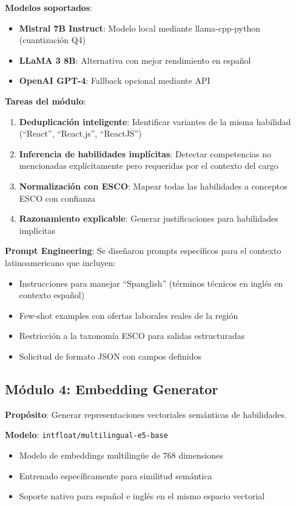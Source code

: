 \textbf{Modelos soportados}:
\begin{itemize}
    \item \textbf{Mistral 7B Instruct}: Modelo local mediante llama-cpp-python (cuantización Q4)
    \item \textbf{LLaMA 3 8B}: Alternativa con mejor rendimiento en español
    \item \textbf{OpenAI GPT-4}: Fallback opcional mediante API
\end{itemize}

\textbf{Tareas del módulo}:
\begin{enumerate}
    \item \textbf{Deduplicación inteligente}: Identificar variantes de la misma habilidad (``React'', ``React.js'', ``ReactJS'')
    \item \textbf{Inferencia de habilidades implícitas}: Detectar competencias no mencionadas explícitamente pero requeridas por el contexto del cargo
    \item \textbf{Normalización con ESCO}: Mapear todas las habilidades a conceptos ESCO con confianza
    \item \textbf{Razonamiento explicable}: Generar justificaciones para habilidades implícitas
\end{enumerate}

\textbf{Prompt Engineering}: Se diseñaron prompts específicos para el contexto latinoamericano que incluyen:
\begin{itemize}
    \item Instrucciones para manejar ``Spanglish'' (términos técnicos en inglés en contexto español)
    \item Few-shot examples con ofertas laborales reales de la región
    \item Restricción a la taxonomía ESCO para salidas estructuradas
    \item Solicitud de formato JSON con campos definidos
\end{itemize}

\subsection{Módulo 4: Embedding Generator}

\textbf{Propósito}: Generar representaciones vectoriales semánticas de habilidades.

\textbf{Modelo}: \texttt{intfloat/multilingual-e5-base}
\begin{itemize}
    \item Modelo de embeddings multilingüe de 768 dimensiones
    \item Entrenado específicamente para similitud semántica
    \item Soporte nativo para español e inglés en el mismo espacio vectorial
\end{itemize}


